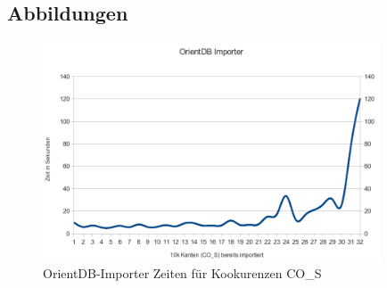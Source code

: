\documentclass[11pt, a4paper, oneside]{article} %
\begin{document}
\newpage
\onecolumn

\begin{appendix}
\section{Abbildungen}

\begin{figure}[htbp]
	\centering
	\includegraphics[width=10cm]{OrientImporter.png} 
	\caption{OrientDB-Importer Zeiten für Kookurenzen CO\_{}S}
	\label{fig:orientdb_import}
\end{figure}

\newpage
\thispagestyle{empty}


\end{appendix}
\end{document}
